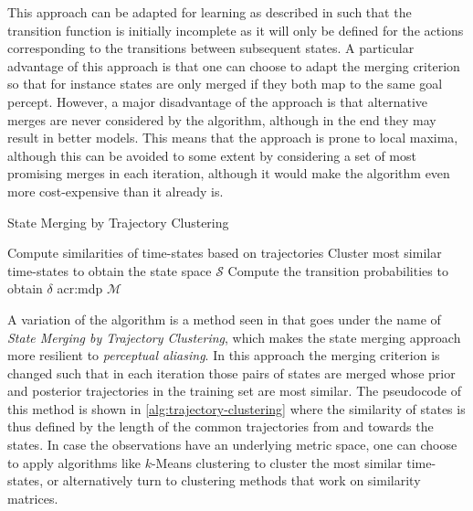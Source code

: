 This approach can be adapted for learning  as described in \cite{nikovski1999learning} such that the transition function is initially incomplete as it will only be defined for the actions corresponding to the transitions between subsequent states.
A particular advantage of this approach is that one can choose to adapt the merging criterion so that for instance states are only merged if they both map to the same goal percept.
However, a major disadvantage of the approach is that alternative merges are never considered by the algorithm, although in the end they may result in better models.
This means that the approach is prone to local maxima, although this can be avoided to some extent by considering a set of most promising merges in each iteration, although it would make the algorithm even more cost-expensive than it already is.

\begin{algorithm}[t]
	\caption{State Merging by Trajectory Clustering}
	\label{alg:trajectory-clustering}
	\begin{algorithmic}[1]
		 
		\State Compute similarities of time-states based on trajectories
		\State Cluster most similar time-states to obtain the state space $\mathcal{S}$
		\State Compute the transition probabilities to obtain $\delta$
		\State \Return \acrshort{acr:mdp} $\mathcal{M}$
	\end{algorithmic}
\end{algorithm}

A variation of the algorithm is a method seen in \cite{nikovski1999learning} that goes under the name of \textit{State Merging by Trajectory Clustering}, which makes the state merging approach more resilient to \textit{perceptual aliasing}.
In this approach the merging criterion is changed such that in each iteration those pairs of states are merged whose prior and posterior trajectories in the training set are most similar.
The pseudocode of this method is shown in \autoref{alg:trajectory-clustering} where the similarity of states is thus defined by the length of the common trajectories from and towards the states. 
In case the observations have an underlying metric space, one can choose to apply algorithms like $k$-Means clustering to cluster the most similar time-states, or alternatively turn to clustering methods that work on similarity matrices.


